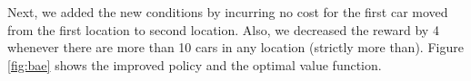 \documentclass[12pt] {article}
\begin{document}
Next, we added the new conditions by incurring no cost for the first car moved from the first location to second location. Also, we decreased the reward by 4 whenever there are more than 10 cars in any location (strictly more than). Figure \ref{fig:bae} shows the improved policy and the optimal value function. 

\begin{figure}[!tbh]
\centering        
        
   

\end{figure}
\end{document}
